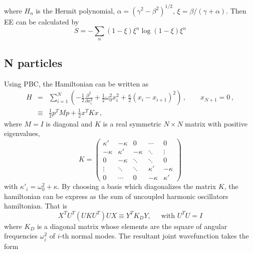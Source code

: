 \documentclass[letterpaper,prb,superscriptaddress]{revtex4}
\theoremstyle{definition}
\begin{document}
where $H_n$ is the Hermit polynomial, $\alpha = (\gamma^2 - \beta^2)^{1/2}$, $\xi = \beta / (\gamma + \alpha)$. Then EE can be calculated by
\begin{equation}
	S = - \sum_{n} (1 - \xi) \xi^n \log(1 - \xi) \xi^n 
\end{equation}























\subsection{N particles}
Using PBC, the Hamiltonian can be written as
\begin{eqnarray}
H &=& \sum_{i=1}^N \left(-\frac{1}{2}\frac{\partial ^2}{\partial x_i^2} + \frac{1}{2}\omega_0^2 x^2_i +  \frac{\kappa}{2} (x_i-x_{i+1})^2 \right)\,, \qquad x_{N+1}=0\,,\\
&\equiv& \frac{1}{2}p^T Mp + \frac{1}{2}x^TKx\,,
\end{eqnarray}
where $M=I$ is diagonal and $K$ is a real symmetric $N\times N$ matrix with positive eigenvalues,
\begin{equation}
K=
\begin{pmatrix}
\kappa'& -\kappa & 0 & \cdots & 0 \\
-\kappa  & \kappa'& -\kappa & \ddots & \vdots \\
0 & -\kappa  & \ddots& \ddots & 0\\
\vdots & \ddots &\ddots & \kappa'&-\kappa \\
0&\cdots & 0 & -\kappa & \kappa'
\end{pmatrix}
\end{equation}
with $\kappa'_i = \omega_0^2+\kappa$. By choosing a basis which diagonalizes the matrix $K$, the hamiltonian can be express as the sum of uncoupled harmonic oscillators hamiltonian. That is
\begin{equation}
	X^T U^T \left( UKU^T \right) UX \equiv Y^TK_DY,\;\;\;\; \text{ with } U^TU = I
\end{equation}
where $K_D$ is a diagonal matrix whose elements are the square of angular frequencies $\omega_i^2$ of $i$-th normal modes. The resultant joint wavefunction takes the form
\end{document}
